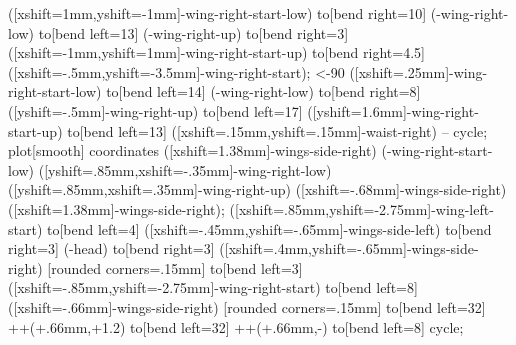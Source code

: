 {        \else
            \pingu@block[left color=\pingu@color@cloak@front,middle color=\pingu@color@cloak@front,right color=\pingu@color@cloak@wings]{\pingu@color@cloak@wings}  ([xshift=1mm,yshift=-1mm]\pingu@name-wing-right-start-low) to[bend right=10] (\pingu@name-wing-right-low) to[bend left=13] (\pingu@name-wing-right-up) to[bend right=3] ([xshift=-1mm,yshift=1mm]\pingu@name-wing-right-start-up) to[bend right=4.5] ([xshift=-.5mm,yshift=-3.5mm]\pingu@name-wing-right-start);
        \fi
        \endpingu@layer
    \else
        \ifnum\@ra<-90%
            \pingu@block[upper left=\pingu@color@cloak@wings,lower left=\pingu@color@cloak@front,lower right=\pingu@color@cloak@front,upper right=\pingu@color@cloak@front]{\pingu@color@cloak@wings} ([xshift=.25mm]\pingu@name-wing-right-start-low) to[bend left=14] (\pingu@name-wing-right-low) to[bend right=8] ([yshift=-.5mm]\pingu@name-wing-right-up) to[bend left=17] ([yshift=1.6mm]\pingu@name-wing-right-start-up) to[bend left=13] ([xshift=.15mm,yshift=.15mm]\pingu@name-waist-right) -- cycle;
        \else %
            \pingu@block[top color=\pingu@color@cloak@front,middle color=\pingu@color@cloak@front,bottom color=\pingu@color@cloak@wings]{\pingu@color@cloak@wings} plot[smooth] coordinates {([xshift=1.38mm]\pingu@name-wings-side-right) (\pingu@name-wing-right-start-low) ([yshift=.85mm,xshift=-.35mm]\pingu@name-wing-right-low) ([yshift=.85mm,xshift=.35mm]\pingu@name-wing-right-up) ([xshift=-.68mm]\pingu@name-wings-side-right) ([xshift=1.38mm]\pingu@name-wings-side-right)};
        \fi
    \fi
\fi
    \pingu@block[rounded corners=.8mm]{\pingu@color@cloak@cap} ([xshift=.85mm,yshift=-2.75mm]\pingu@name-wing-left-start) to[bend left=4] ([xshift=-.45mm,yshift=-.65mm]\pingu@name-wings-side-left) to[bend right=3]
    (\pingu@name-head)
    to[bend right=3]
    ([xshift=.4mm,yshift=-.65mm]\pingu@name-wings-side-right) [rounded corners=.15mm] to[bend left=3] ([xshift=-.85mm,yshift=-2.75mm]\pingu@name-wing-right-start)
    to[bend left=8]
    ([xshift=-.66mm]\pingu@name-wings-side-right)
    [rounded corners=.15mm]
    to[bend left=32] ++(\pingu@w@half+.66mm,\pingu@w@half+1.2\pingu@one)
    to[bend left=32] ++(\pingu@w@half+.66mm,-\pingu@one)
    to[bend left=8] cycle;
\endscope
}